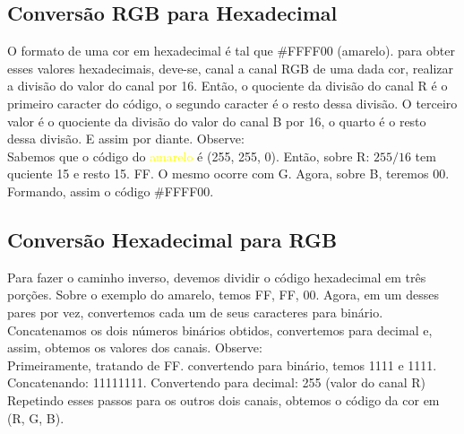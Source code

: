 \documentclass[a4paper, 12pt]{article}
\begin{document}
\subsection{Conversão RGB para Hexadecimal}
O formato de uma cor em hexadecimal é tal que \#FFFF00 (amarelo). para obter esses valores hexadecimais, deve-se, canal a canal RGB de uma dada cor, 
realizar a divisão do valor do canal por 16. Então, o quociente da divisão do canal R é o primeiro caracter do código, o segundo caracter 
é o resto dessa divisão. O terceiro valor é o quociente da divisão do valor do canal B por 16, o quarto é o resto dessa divisão. E assim por diante.
Observe:
\\
Sabemos que o código do \textcolor{yellow}{amarelo} é (255, 255, 0). Então, sobre R: $255/16$ tem quciente 15 e resto 15. FF. O mesmo ocorre com G. 
Agora, sobre B, teremos 00. Formando, assim o código \#FFFF00.

\subsection{Conversão Hexadecimal para RGB}
Para fazer o caminho inverso, devemos dividir o código hexadecimal em três porções. Sobre o exemplo do amarelo, temos FF, FF, 00. Agora, em um desses pares 
por vez, convertemos cada um de seus caracteres para binário. Concatenamos os dois números binários obtidos, convertemos para decimal e, assim, obtemos os valores dos canais. Observe: 
\\
Primeiramente, tratando de FF. convertendo para binário, temos 1111 e 1111. Concatenando: 11111111. Convertendo para decimal: 255 (valor do canal R)
Repetindo esses passos para os outros dois canais, obtemos o código da cor em (R, G, B).
\end{document}
